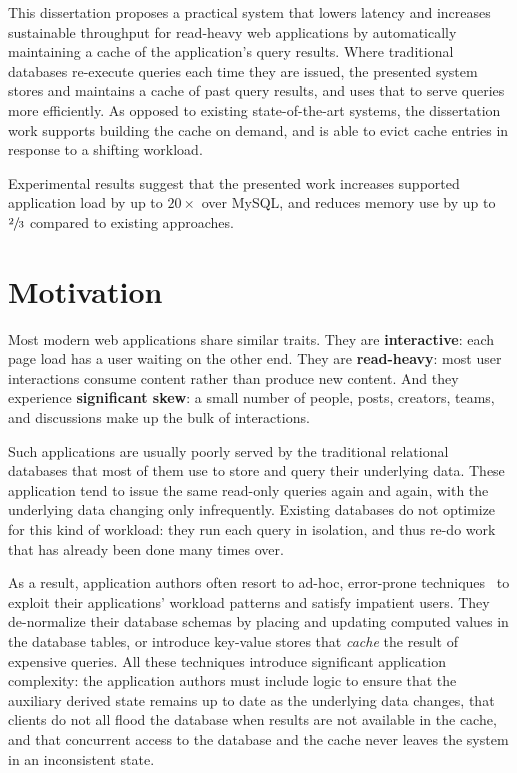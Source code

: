 This dissertation proposes a practical system that lowers latency and increases
sustainable throughput for read-heavy web applications by automatically
maintaining a cache of the application's query results. Where traditional
databases re-execute queries each time they are issued, the presented system
stores and maintains a cache of past query results, and uses that to serve
queries more efficiently. As opposed to existing state-of-the-art systems, the
dissertation work supports building the cache on demand, and is able to evict
cache entries in response to a shifting workload.

Experimental results suggest that the presented work increases supported
application load by up to $20\times$ over MySQL, and reduces memory use by up to
$\sfrac{2}{3}$ compared to existing approaches.

\section{Motivation}

Most modern web applications share similar traits. They are
\textbf{interactive}: each page load has a user waiting on the other end. They
are \textbf{read-heavy}: most user interactions consume content rather than
produce new content. And they experience \textbf{significant skew}: a small
number of people, posts, creators, teams, and discussions make up the bulk of
interactions.

Such applications are usually poorly served by the traditional relational
databases that most of them use to store and query their underlying data.
These application tend to issue the same read-only queries again and again, with
the underlying data changing only infrequently. Existing databases do
not optimize for this kind of workload: they run each query in isolation, and
thus re-do work that has already been done many times over.

As a result, application authors often resort to ad-hoc, error-prone
techniques~\cite{ad-hoc-caching} to exploit their applications' workload
patterns and satisfy impatient users. They de-normalize their database schemas
by placing and updating computed values in the database tables, or introduce
key-value stores that \textit{cache} the result of expensive queries. All these
techniques introduce significant application complexity: the application authors
must include logic to ensure that the auxiliary derived state remains up to date
as the underlying data changes, that clients do not all flood the database when
results are not available in the cache, and that concurrent access to the
database and the cache never leaves the system in an inconsistent state.

